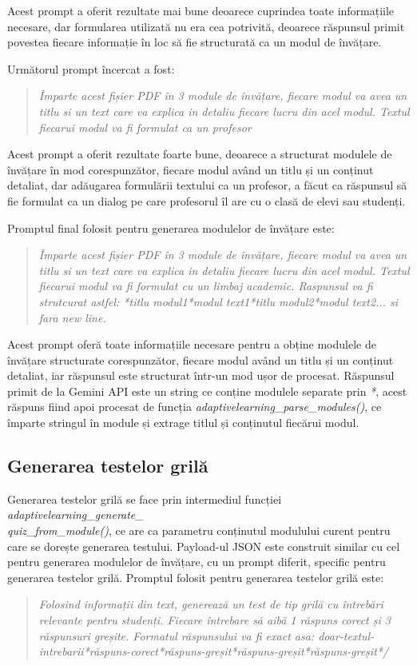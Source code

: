 Acest prompt a oferit rezultate mai bune deoarece cuprindea toate informațiile necesare, dar formularea utilizată nu era cea potrivită, deoarece răspunsul primit povestea fiecare informație 
în loc să fie structurată ca un modul de învățare.

Următorul prompt încercat a fost: 
\begin{quote}
    \textit{Împarte acest fișier PDF în 3 module de învățare, fiecare modul va avea un titlu si un text care va explica in detaliu fiecare lucru din acel modul. Textul fiecarui modul va fi formulat ca un profesor}
\end{quote}

Acest prompt a oferit rezultate foarte bune, deoarece a structurat modulele de învățare în mod corespunzător, fiecare modul având un titlu și un conținut detaliat, dar adăuga\-rea formulării
textului ca un profesor, a făcut ca răspunsul să fie formulat ca un dialog pe care profesorul îl are cu o clasă de elevi sau studenți.

Promptul final folosit pentru generarea modulelor de învățare este:
\begin{quote}
    \textit{Împarte acest fișier PDF în 3 module de învățare, fiecare modul va avea un titlu si un text care va explica in detaliu fiecare lucru din acel modul. Textul fiecarui modul va fi formulat cu un limbaj academic. Raspunsul va fi strutcurat astfel: *titlu modul1*modul text1*titlu modul2*modul text2... si fara new line.}
\end{quote}

Acest prompt oferă toate informațiile necesare pentru a obține modulele de învățare structurate corespunzător, fiecare modul având un titlu și un conținut detaliat, iar răspunsul este
structurat într-un mod ușor de procesat. Răspunsul primit de la Gemini API este un string ce conține modulele separate prin \textit{*}, acest răspuns fiind apoi procesat de funcția
\textit{adaptivelearning\_parse\_modules()}, ce împarte stringul în module și extrage titlul și conținutul fiecărui modul.
\subsection{Generarea testelor grilă}
Generarea testelor grilă se face prin intermediul funcției \textit{adaptivelearning\_generate\_}\\\textit{quiz\_from\_module()}, ce are ca parametru conținutul modulului curent pentru care se 
dorește generarea testului. Payload-ul JSON este construit similar cu cel pentru generarea modulelor de învățare, cu un prompt diferit, specific pentru generarea testelor grilă.
Promptul folosit pentru generarea testelor grilă este:
\begin{quote}
    \textit{Folosind informații din text, generează un test de tip grilă cu întrebări relevante pentru studenți. Fiecare întrebare să aibă 1 răspuns corect și 3 răspunsuri greșite. Formatul răspunsului va fi exact asa: doar-textul-intrebarii*răspuns-corect*răspuns-greșit*răspuns-greșit*răspuns-greșit*/}
\end{quote}

